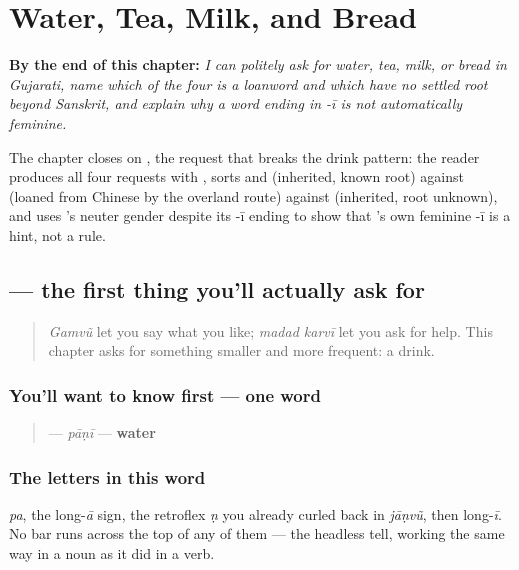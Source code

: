
\chapter{Water, Tea, Milk, and Bread}
\label{ch:gu-request-food-drink}

\begin{chapteropening}
\textbf{By the end of this chapter:} \emph{I can politely ask for water, tea, milk, or bread in Gujarati, name which of the four is a loanword and which have no settled root beyond Sanskrit, and explain why a word ending in -ī is not automatically feminine.}

The chapter closes on , the request that breaks the drink pattern: the reader produces all four requests with  , sorts  and  (inherited, known root) against  (loaned from Chinese by the overland route) against  (inherited, root unknown), and uses 's neuter gender despite its -ī ending to show that 's own feminine -ī is a hint, not a rule.
\end{chapteropening}

\section[\texorpdfstring{\gu{પાણી} (pāṇī)}{પાણી (pāṇī)}]{ — the first thing you'll actually ask for}

\label{lesson:GU-C10-paani}



\begin{quote}
\emph{Gamvũ} let you say what you like; \emph{madad karvī} let you ask for help. This chapter asks for something smaller and more frequent: a drink.
\end{quote}

\subsection*{You'll want to know first — one word}
\begin{quote}
\textbf{} — \emph{pāṇī} — \textbf{water}
\end{quote}

\subsection*{The letters in this word}
\textbf{} \emph{pa}, \textbf{} the long-\emph{ā} sign, \textbf{} the retroflex \emph{ṇ} you already curled back in \emph{jāṇvũ}, then \textbf{} long-\emph{ī}. No bar runs across the top of any of them — the headless tell, working the same way in a noun as it did in a verb.


